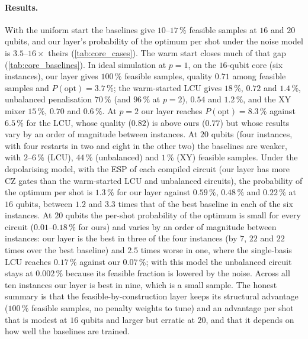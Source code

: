 



\paragraph{Results.} With the uniform start the baselines give $10$--$17\,\%$ feasible samples at $16$ and $20$ qubits, and our layer's probability of the optimum per shot under the noise model is $3.5$--$16\times$ theirs (\cref{tab:core_cases}). The warm start closes much of that gap (\cref{tab:core_baselines}). In ideal simulation at $p=1$, on the $16$-qubit core (six instances), our layer gives $100\,\%$ feasible samples, quality $0.71$ among feasible samples and $P(\mathrm{opt})=3.7\,\%$; the warm-started LCU gives $18\,\%$, $0.72$ and $1.4\,\%$, unbalanced penalisation $70\,\%$ (and $96\,\%$ at $p=2$), $0.54$ and $1.2\,\%$, and the XY mixer $15\,\%$, $0.70$ and $0.6\,\%$. At $p=2$ our layer reaches $P(\mathrm{opt})=8.3\,\%$ against $6.5\,\%$ for the LCU, whose quality ($0.82$) is above ours ($0.77$) but whose results vary by an order of magnitude between instances. At $20$ qubits (four instances, with four restarts in two and eight in the other two) the baselines are weaker, with $2$--$6\,\%$ (LCU), $44\,\%$ (unbalanced) and $1\,\%$ (XY) feasible samples. Under the depolarising model, with the ESP of each compiled circuit (our layer has more CZ gates than the warm-started LCU and unbalanced circuits), the probability of the optimum per shot is $1.3\,\%$ for our layer against $0.59\,\%$, $0.48\,\%$ and $0.22\,\%$ at $16$ qubits, between $1.2$ and $3.3$ times that of the best baseline in each of the six instances. At $20$ qubits the per-shot probability of the optimum is small for every circuit ($0.01$--$0.18\,\%$ for ours) and varies by an order of magnitude between instances: our layer is the best in three of the four instances (by $7$, $22$ and $22$ times over the best baseline) and $2.5$ times worse in one, where the single-basis LCU reaches $0.17\,\%$ against our $0.07\,\%$; with this model the unbalanced circuit stays at $0.002\,\%$ because its feasible fraction is lowered by the noise. Across all ten instances our layer is best in nine, which is a small sample. The honest summary is that the feasible-by-construction layer keeps its structural advantage ($100\,\%$ feasible samples, no penalty weights to tune) and an advantage per shot that is modest at $16$ qubits and larger but erratic at $20$, and that it depends on how well the baselines are trained.

